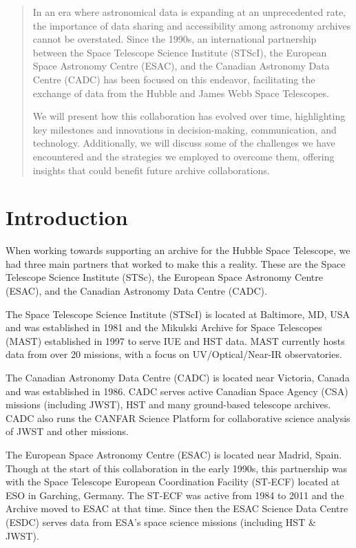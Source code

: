 \documentclass[11pt,twoside]{article}
\begin{document}


\begin{abstract}
In an era where astronomical data is expanding at an unprecedented rate, the importance of data sharing and accessibility among astronomy archives cannot be overstated. 
Since the 1990s, an international partnership between the Space Telescope Science Institute (STScI), the European Space Astronomy Centre (ESAC), 
and the Canadian Astronomy Data Centre (CADC) has been focused on this endeavor, facilitating the exchange of data from the Hubble and James Webb Space Telescopes.

We will present how this collaboration has evolved over time, highlighting key milestones and innovations in decision-making, communication, and technology. 
Additionally, we will discuss some of the challenges we have encountered and the strategies we employed to overcome them, offering insights that could benefit future archive collaborations.
\end{abstract}

\section{Introduction}

When working towards supporting an archive for the Hubble Space Telescope, we had three main partners that worked to make this a reality.
These are the Space Telescope Science Institute (STSc), the European Space Astronomy Centre (ESAC), and the Canadian Astronomy Data Centre (CADC).

The Space Telescope Science Institute (STScI) is located at Baltimore, MD, USA and was established in 1981 and the Mikulski Archive for Space Telescopes (MAST) established in 1997 to serve IUE and HST data. MAST currently hosts data from over 20 missions, with a focus on UV/Optical/Near-IR observatories.

The Canadian Astronomy Data Centre (CADC) is located near Victoria, Canada and was established in 1986.
CADC serves active Canadian Space Agency (CSA) missions (including JWST), HST and many ground-based telescope archives.
CADC also runs the CANFAR Science Platform for collaborative science analysis of JWST and other missions.

The European Space Astronomy Centre (ESAC) is located near Madrid, Spain. Though at the start of this collaboration in the early 1990s, this partnership was with the Space Telescope European Coordination Facility (ST-ECF) located at ESO in Garching, Germany. 
The ST-ECF was active from 1984 to 2011 and the Archive moved to ESAC at that time. 
Since then the ESAC Science Data Centre (ESDC) serves data from ESA's space science missions (including HST \& JWST).
\end{document}
